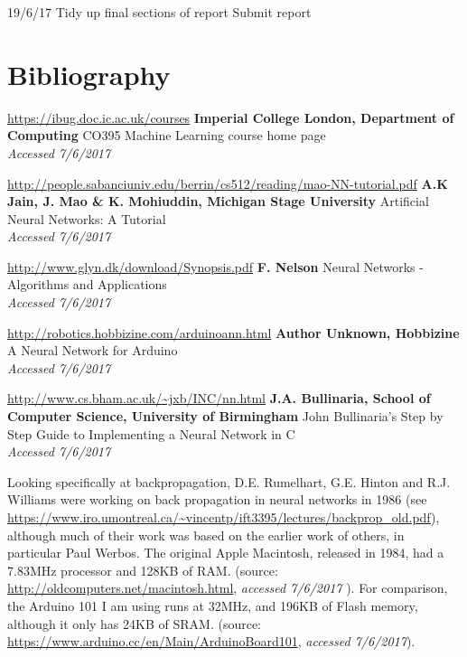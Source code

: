 \documentclass[a4paper]{article}
\begin{document}
19/6/17
    Tidy up final sections of report
    Submit report

\newpage
\section{Bibliography}
\label{sec:bi}

\begin{thebibliography}{9}



\url{https://ibug.doc.ic.ac.uk/courses}
\textbf{Imperial College London, Department of Computing}
CO395 Machine Learning course home page
\\\textit{Accessed 7/6/2017}

\url{http://people.sabanciuniv.edu/berrin/cs512/reading/mao-NN-tutorial.pdf}
\textbf{A.K Jain, J. Mao \& K. Mohiuddin, Michigan Stage University}
Artificial Neural Networks: A Tutorial
\\\textit{Accessed 7/6/2017}

\url{http://www.glyn.dk/download/Synopsis.pdf}
\textbf{F. Nelson}
Neural Networks - Algorithms and Applications
\\\textit{Accessed 7/6/2017}

\url{http://robotics.hobbizine.com/arduinoann.html}
\textbf{Author Unknown, Hobbizine}
A Neural Network for Arduino
\\\textit{Accessed 7/6/2017}

\url{http://www.cs.bham.ac.uk/~jxb/INC/nn.html}
\textbf{J.A. Bullinaria, School of Computer Science, University of Birmingham}
John Bullinaria's Step by Step Guide to Implementing a Neural Network in C
\\\textit{Accessed 7/6/2017}

Looking specifically at backpropagation, D.E. Rumelhart, G.E. Hinton and R.J. Williams were working on back propagation in neural networks in 1986 (see \url{https://www.iro.umontreal.ca/~vincentp/ift3395/lectures/backprop_old.pdf}), although much of their work was based on the earlier work of others, in particular Paul Werbos. 
The original Apple Macintosh, released in 1984, had a 7.83MHz processor and 128KB of RAM. (source: \url{http://oldcomputers.net/macintosh.html}, \textit{accessed 7/6/2017}
). For comparison, the Arduino 101 I am using runs at 32MHz, and 196KB of Flash memory, although it only has 24KB of SRAM. (source: \url{https://www.arduino.cc/en/Main/ArduinoBoard101}, \textit{accessed 7/6/2017}).


\end{thebibliography}
\end{document}
